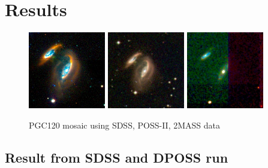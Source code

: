 \documentclass[authoryear, 12pt,5p, times]{elsarticle}
\begin{document}
\section{Results\label{results-sec}}
\begin{figure}[t!]
\centering
	\includegraphics[width=0.3\textwidth]{figures/SDSS_120_LOW}
	\includegraphics[width=0.3\textwidth]{figures/DSS_120_BEST}	
	\includegraphics[width=0.3\textwidth]{figures/2MASS_120_BEST}
	\caption{PGC120 mosaic using SDSS, POSS-II, 2MASS data }
	\label{fig:comparison}
\end{figure}
\subsection{Result from SDSS and DPOSS run}
\end{document}
